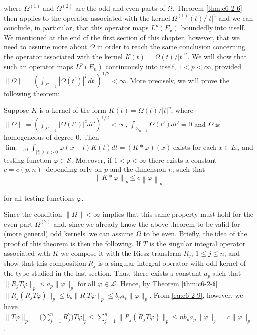 where $\Omega^{(1)}$ and $\Omega^{(2)}$ are the odd and even parts of $\Omega$. Theorem \ref{thm:c6-2-6} then applies to the operator associated with the kernel $\Omega^{(1)}(t)/|t|^{n}$ and we can conclude, in particular, that this operator maps $L^{p}(E_{n})$ boundedly into itself. We mentioned at the end of the first section of this chapter, however, that we need to assume more about $\Omega$ in order to reach the same conclusion concerning the operator associated with the kernel $K(t)=\Omega(t)/|t|^{n}$. We will show that such an operator maps $L^{p}(E_{n})$ continuously into itself, $1<p<\infty$, provided $\|\Omega\|=(\int_{\Sigma_{n-1}}|\Omega(t^{\prime})|^{2}\,dt^{\prime})^{1/2}<\infty$. More precisely, we will prove the following theorem:

\begin{theorem}
\label{thm:c6-3-1}
Suppose $K$ is a kernel of the form $K(t) = \Omega(t)/|t|^{n}$, where $\|\Omega\| = (\int_{\Sigma_{n-1}}|\Omega(t')|^{2}dt')^{1/2} < \infty$, $\int_{\Sigma_{n-1}}\Omega(t') dt' = 0$ and $\Omega$ is homogeneous of degree 0. Then $\lim_{\varepsilon \to 0} \int_{|t| \geq \varepsilon > 0} \varphi(x - t) K(t) dt = (K * \varphi)(x)$ exists for each $x \in E_n$ and testing function $\varphi \in \mathcal{S}$. Moreover, if $1 < p < \infty$ there exists a constant $c = c(p, n)$, depending only on $p$ and the dimension $n$, such that
\[
\left\|K*\varphi\right\|_{p}\leq c\left\|\varphi\right\|_{p}
\]

for all testing functions $\varphi$.
\end{theorem}

Since the condition $\|\Omega\| < \infty$ implies that this same property must hold for the even part $\Omega^{(2)}$ and, since we already know the above theorem to be valid for (more general) odd kernels, we can assume $\Omega$ to be even. Briefly, the idea of the proof of this theorem is then the following. If $T$ is the singular integral operator associated with $K$ we compose it with the Riesz transform $R_j$, $1 \leq j \leq n$, and show that this composition $R_j$ is a singular integral operator with odd kernel of the type studied in the last section. Thus, there exists a constant $a_p$ such that $\|R_j T\varphi\|_p \leq a_p \|\varphi\|_p$ for all $\varphi \in \mathcal{L}$. Hence, by Theorem \ref{thm:c6-2-6} $\|R_j(R_j T\varphi)\|_p \leq b_p \|R_j T\varphi\|_p \leq b_p a_p \|\varphi\|_p$. From \eqref{eq:c6-2-9}, however, we have $\|T\varphi\|_p = \big(\sum_{j=1}^n R_j^2\big) T\varphi\big|_p \leq \sum_{j=1}^n \|R_j(R_j T\varphi)\|_p \leq nb_p a_p \|\varphi\|_p = c\|\varphi\|_p$.

